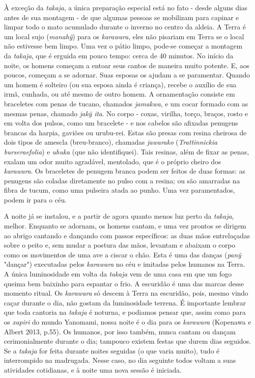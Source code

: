 À exceção da \emph{takaja}, a única preparação especial está no fato -
desde alguns dias antes de sua montagem - de que algumas pessoas se
mobilizam para capinar e limpar todo o mato acumulado durante o inverno
no centro da aldeia. A Terra é um local sujo (\emph{manahỹ}) para os
\emph{karawara}, eles não pisariam em Terra se o local não estivesse bem
limpo. Uma vez o pátio limpo, pode-se começar a montagem da
\emph{takaja}, que é erguida em pouco tempo: cerca de 40 minutos. No
início da noite, os homens começam a entoar seus cantos de maneira muito
potente. E, aos poucos, começam a se adornar. Suas esposas os ajudam a
se paramentar. Quando um homem é solteiro (ou sua esposa ainda é
criança), recebe o auxílio de sua irmã, cunhada, ou até mesmo de outro
homem. A ornamentação consiste em braceletes com penas de tucano,
chamados \emph{jamakwa}, e um cocar formado com as mesmas penas, chamado
\emph{jakỹ ita}. No corpo - coxas, virilha, torço, braços, rosto e em
volta dos pulsos, como um bracelete - e nos cabelos são afixadas
penugens brancas da harpia, gaviões ou urubu-rei. Estas são presas com
resina cheirosa de dois tipos de amescla (breu-branco), chamadas
\emph{jawarako} (\emph{Trattinnickia burseraefolia}) e \emph{uhuka} (que
não identifiquei). Tais resinas, além de fixar as penas, exalam um odor
muito agradável, mentolado, que é o próprio cheiro dos \emph{karawara}.
Os braceletes de penugem branca podem ser feitos de duas formas: as
penugens são coladas diretamente no pulso com a resina; ou são amarradas
na fibra de tucum, como uma pulseira atada ao punho. Uma vez
paramentados, podem ir para o céu.

A noite já se instalou, e a partir de agora quanto menos luz perto da
\emph{takaja}, melhor. Enquanto se adornam, os homens cantam, e uma vez
prontos se dirigem ao abrigo cantando e dançando com passos específicos:
as duas mãos entrelaçadas sobre o peito e, sem mudar a postura das mãos,
levantam e abaixam o corpo como os movimentos de uma ave a ciscar o
chão. Esta é uma das danças (\emph{panỹ} "dançar") executadas pelos
\emph{karawara} no céu e imitadas pelos humanos na Terra. A única
luminosidade em volta da \emph{takaja} vem de uma casa em que um fogo
queima bem baixinho para espantar o frio. A escuridão é uma das marcas
desse momento ritual. Os \emph{karawara} só descem à Terra na escuridão,
pois, mesmo vindo caçar durante o dia, não gostam da luminosidade
terrena. É importante lembrar que toda cantoria na \emph{takaja} é
noturna, e podiamos pensar que, assim como para os \emph{xapiri} do
mundo Yanomami, nossa noite é o dia para os \emph{karawara} (Kopenawa e
Albert 2013, p.55). Os humanos, por isso também, nunca cantam ou dançam
cerimonialmente durante o dia; tampouco existem festas que durem dias
seguidos. Se a \emph{takaja} for feita durante noites seguidas (o que
varia muito), tudo é interrompido na madrugada. Nesse caso, no dia
seguinte todos voltam a suas atividades cotidianas, e à noite uma nova
sessão é iniciada.

